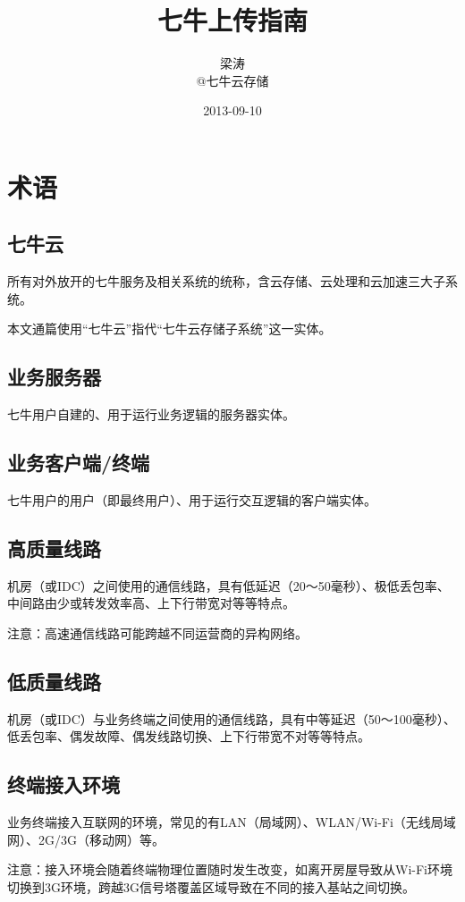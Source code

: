 \documentclass[11pt, oneside]{book}
\title{七牛上传指南}
\author{梁涛 \\ @七牛云存储}
\date{2013-09-10}
\newcommand{\qpara}[1]{
\vspace{0.3em}
\noindent
#1\par
\vspace{0.3em}
}
\begin{document}
\maketitle
\tableofcontents

\chapter{术语}

\section{七牛云}

\qpara{所有对外放开的七牛服务及相关系统的统称，含云存储、云处理和云加速三大子系统。}
\qpara{本文通篇使用“七牛云”指代“七牛云存储子系统”这一实体。}

\section{业务服务器}

\qpara{七牛用户自建的、用于运行业务逻辑的服务器实体。}

\section{业务客户端/终端}

\qpara{七牛用户的用户（即最终用户）、用于运行交互逻辑的客户端实体。}

\section{高质量线路}

\qpara{机房（或IDC）之间使用的通信线路，具有低延迟（20～50毫秒）、极低丢包率、中间路由少或转发效率高、上下行带宽对等等特点。}
\qpara{注意：高速通信线路可能跨越不同运营商的异构网络。}

\section{低质量线路}

\qpara{机房（或IDC）与业务终端之间使用的通信线路，具有中等延迟（50～100毫秒）、低丢包率、偶发故障、偶发线路切换、上下行带宽不对等等特点。}

\section{终端接入环境}

\qpara{业务终端接入互联网的环境，常见的有LAN（局域网）、WLAN/Wi-Fi（无线局域网）、2G/3G（移动网）等。}
\qpara{注意：接入环境会随着终端物理位置随时发生改变，如离开房屋导致从Wi-Fi环境切换到3G环境，跨越3G信号塔覆盖区域导致在不同的接入基站之间切换。}
\end{document}
